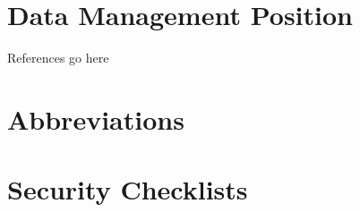 \documentclass[a4paper]{report}
\newif\ifstructure
\begin{document}
	\chapter{Data Management Position}
	\label{position}
	
	\ifstructure
		
	\else
		
	\fi
	
	\clearpage
	
	References go here
	
	\appendix
	\chapter{Abbreviations}
	\label{abbreviations}
	
	\ifstructure
	\else 
	
	\fi
	
	\chapter{Security Checklists}
	\label{security-appendix}
	
	\ifstructure
	\else 
		
	\fi
\end{document}

